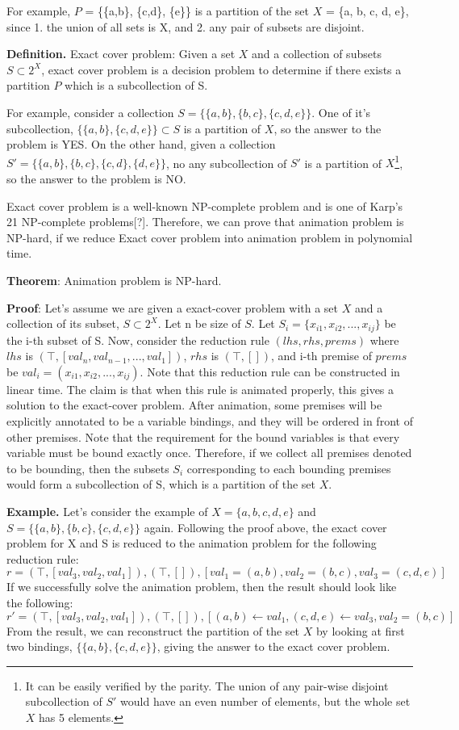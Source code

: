 For example, $P$ = \{\{a,b\}, \{c,d\}, \{e\}\} is a partition of the set $X$ = \{a, b, c, d, e\},
since 1. the union of all sets is X, and 2. any pair of subsets are disjoint.

\textbf{Definition.} Exact cover problem: Given a set $X$ and a collection of subsets $S \subset 2^X$,
exact cover problem is a decision problem to determine if there exists a partition $P$ which is a
subcollection of S.

For example, consider a collection $S = \{\{a,b\}, \{b,c\}, \{c,d,e\}\}$.
One of it's subcollection, $\{\{a,b\}, \{c,d,e\}\} \subset S$ is a partition of $X$,
so the answer to the problem is YES.
On the other hand, given a collection $S' = \{\{a,b\}, \{b,c\}, \{c,d\}, \{d,e\}\}$,
no any subcollection of $S'$ is a partition of $X$\footnote{It can be easily
verified by the parity. The union of any pair-wise disjoint subcollection of $S'$ would have an even number
of elements, but the whole set $X$ has 5 elements.}, so the answer to the problem is
NO.

Exact cover problem is a well-known NP-complete problem and is one of Karp's 21 NP-complete problems[?].
Therefore, we can prove that animation problem is NP-hard, if we reduce Exact cover problem
into animation problem in polynomial time.

\textbf{Theorem}: Animation problem is NP-hard.

\textbf{Proof}: Let's assume we are given a exact-cover problem with a set $X$ and a
collection of its subset, $S \subset 2^X$. Let n be size of $S$.
Let $S_i = \{x_{i1}, x_{i2}, ..., x_{ij}\}$ be the i-th subset of S.
Now, consider the reduction rule $(lhs, rhs, prems)$ where
$lhs$ is $(\top, [val_n, val_{n-1}, ..., val_1])$,
$rhs$ is $(\top, [])$, and
i-th premise of $prems$ be $val_i = (x_{i1}, x_{i2}, ..., x_{ij})$.
Note that this reduction rule can be constructed in linear time.
The claim is that when this rule is animated properly, this gives a solution to the exact-cover problem.
After animation, some premises will be explicitly annotated to be a variable bindings,
and they will be ordered in front of other premises. Note that the requirement for the
bound variables is that every variable must be bound exactly once. Therefore, if we collect
all premises denoted to be bounding, then the subsets $S_i$ corresponding to each bounding premises
would form a subcollection of S, which is a partition of the set $X$.

\textbf{Example.}
Let's consider the example of $X = \{a, b, c, d, e\}$ and $S = \{\{a,b\}, \{b,c\}, \{c,d,e\}\}$ again.
Following the proof above, the exact cover problem for X and S is reduced to the animation problem for the
following reduction rule:
\[r = (\top, [val_3, val_2, val_1]), (\top, []), [val_1 = (a,b), val_2 = (b,c), val_3 = (c, d, e)]\]
If we successfully solve the animation problem, then the result should look like the following:
\[r' = (\top, [val_3, val_2, val_1]), (\top, []), [(a,b) \leftarrow val_1, (c, d, e) \leftarrow val_3, val_2 = (b,c)]\]
From the result, we can reconstruct the partition of the set $X$ by looking at first two bindings,
$\{\{a, b\}, \{c, d, e\}\}$, giving the answer to the exact cover problem.

